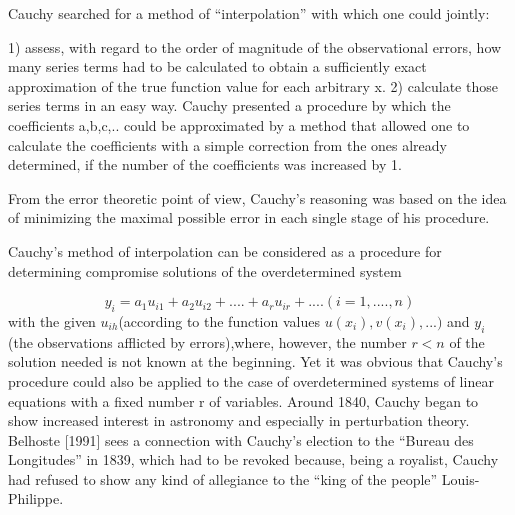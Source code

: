 \documentclass{article}
\begin{document}
Cauchy searched for a method of “interpolation” with which one could jointly:

1) assess, with regard to the order of magnitude of the observational
errors, how many series terms had to be calculated to obtain a sufficiently exact approximation of the true function value for each arbitrary x.
2) calculate those series terms in an easy way. Cauchy \cite{1852Comptes} presented a procedure by which the coefficients a,b,c,.. could be approximated by a method that allowed one to calculate the coefficients with a simple correction from the ones already determined, if the number of the coefficients was increased by 1.

From the error theoretic point of view, Cauchy’s reasoning was based on the idea of minimizing the maximal possible error in each single stage of his procedure.

Cauchy’s method of interpolation can be considered as a procedure for determining compromise solutions  of the overdetermined system

\[y_i = a_1u_{i1} +a_2u_{i2}+....+a_r u_{ir}+....(i=1,....,n) \]
with the given $u_{ih} $(according to the function values $u(x_i),v(x_i),...)$ and  $ y_i$ (the observations afflicted by errors),where, however, the number $r < n$ of the solution needed is not known at the beginning. 
Yet it was obvious that Cauchy’s procedure could
also be applied to the case of overdetermined systems of linear equations with a fixed number r of variables.
Around 1840, Cauchy began to show increased interest in astronomy and especially in perturbation theory. Belhoste [1991] sees a connection with Cauchy’s election to the “Bureau des Longitudes” in 1839, which had to be revoked
because, being a royalist, Cauchy had refused to show any kind of allegiance to the “king of the people” Louis-Philippe. 
\end{document}
